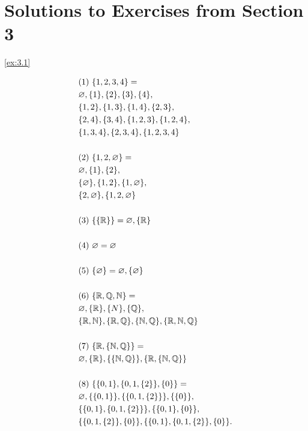 
\section*{Solutions to Exercises from Section 3}
\begin{solution}\label{sol:3.1}\ref{ex:3.1}
    
    $$
    \begin{aligned}
        &(1)~ \{ 1,2,3,4 \}=\\
        &\varnothing, \{ 1 \},\{ 2 \},\{ 3 \},\{ 4 \},\\
        &\{ 1,2 \},\{ 1,3 \},\{ 1,4 \},\{ 2,3 \},\\
        &\{ 2,4 \}, \{ 3,4 \},\{ 1,2,3 \},\{ 1,2,4 \},\\
        &\{ 1,3,4 \}, \{ 2,3,4 \}, \{ 1,2,3,4 \}\\\\
        &(2)~\{ 1,2,\varnothing \}=\\
        &\varnothing, \{ 1 \},\{ 2\},\\
        &\{ \varnothing \}, \{ 1,2 \},\{ 1,\varnothing \},\\
        &\{ 2,\varnothing \}, \{ 1,2,\varnothing \}\\\\
        &(3)~ \{ \{ \mathbb{R} \} \}=\varnothing, \{ \mathbb{R} \}\\\\
        &(4)~\varnothing = \varnothing\\\\
        &(5)~\{ \varnothing \}=\varnothing, \{ \varnothing \}\\\\
        &(6)~\{ \mathbb{R},\mathbb{Q},\mathbb{N} \}=\\
        &\varnothing, \{ \mathbb{R} \},\{ N \},\{ \mathbb{Q} \},\\
        &\{ \mathbb{R},\mathbb{N} \},\{ \mathbb{R},\mathbb{Q} \}, \{ \mathbb{N},\mathbb{Q} \},\{ \mathbb{R},\mathbb{N},\mathbb{Q} \}\\\\
        &(7)~\{ \mathbb{R},\{ \mathbb{N},\mathbb{Q} \} \}=\\
        &\varnothing, \{ \mathbb{R} \},\{\{ \mathbb{N},\mathbb{Q} \}\}, \{ \mathbb{R},\{ \mathbb{N},\mathbb{Q} \} \}\\\\
        &(8)~\{ \{ 0,1 \},\{ 0,1,\{ 2 \} \},\{ 0 \} \}=\\
        &\varnothing, \{\{ 0,1 \}\}, \{\{ 0,1,\{ 2 \} \}\},\{\{ 0 \}\},\\
        &\{ \{ 0,1 \},\{ 0,1,\{ 2 \} \} \}, \{ \{ 0,1 \}, \{ 0 \} \},\\
        &\{ \{ 0,1,\{ 2 \} \},\{ 0 \} \}, \{ \{ 0,1 \},\{ 0,1,\{ 2 \} \},\{ 0 \} \}.
    \end{aligned}
    $$
\end{solution}

